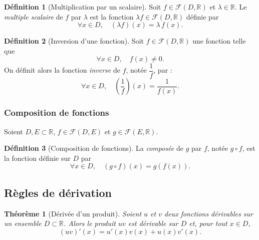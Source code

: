 \documentclass{report} %
\theoremstyle{definition}  %
\newtheorem{definition}{Définition}[chapter] %
\theoremstyle{plain} %
\newtheorem{theorem}{Théorème}[chapter]
\theoremstyle{remark} %
\begin{document}
\begin{definition}[Multiplication par un scalaire]
Soit \(f \in \mathcal{F}(D,\mathbb{R})\) et \(\lambda \in \mathbb{R}\).
Le \emph{multiple scalaire} de \(f\) par \(\lambda\) est la fonction \(\lambda f \in \mathcal{F}(D,\mathbb{R})\) définie par
\[
\forall x \in D, \quad (\lambda f)(x) = \lambda\,f(x).
\]
\end{definition}

\begin{definition}[Inversion d’une fonction]
Soit \(f \in \mathcal{F}(D,\mathbb{R})\) une fonction telle que
\[
\forall x \in D, \quad f(x) \neq 0.
\]
On définit alors la fonction \emph{inverse} de \(f\), notée \(\dfrac{1}{f}\), par :
\[
\forall x \in D, \quad \left(\frac{1}{f}\right)(x) = \frac{1}{f(x)}.
\]
\end{definition}



\subsubsection{Composition de fonctions}

Soient \(D,E \subset \mathbb{R}\), \(f \in \mathcal{F}(D,E)\) et \(g \in \mathcal{F}(E,\mathbb{R})\).

\begin{definition}[Composition de fonctions]
La \emph{composée} de \(g\) par \(f\), notée \(g \circ f\), est la fonction définie sur \(D\) par
\[
\forall x \in D, \quad (g \circ f)(x) = g(f(x)).
\]
\end{definition}

\subsection{Règles de dérivation}

\begin{theorem}[Dérivée d’un produit]
Soient \(u\) et \(v\) deux fonctions dérivables sur un ensemble \(D \subset \mathbb{R}\).
Alors le produit \(uv\) est dérivable sur \(D\) et, pour tout \(x \in D\),
\[
(uv)'(x) = u'(x)v(x) + u(x)v'(x).
\]
\end{theorem}

\medskip
\end{document}
